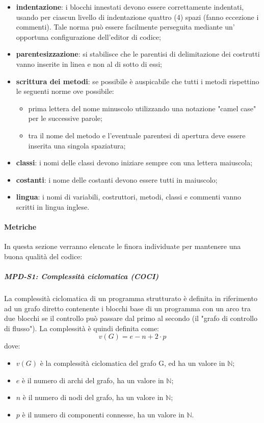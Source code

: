 \begin{itemize}
  \item \textbf{indentazione}: i blocchi innestati devono essere correttamente indentati, usando per ciascun livello di indentazione quattro (4) spazi (fanno eccezione i commenti).  Tale norma può essere facilmente perseguita mediante un' opportuna configurazione dell'editor di codice;
  \item \textbf{parentesizzazione}: si stabilisce che le parentisi di delimitazione dei costrutti vanno inserite in linea e non al di sotto di essi;
  \item \textbf{scrittura dei metodi}: se possibile è auspicabile che tutti i metodi rispettino le seguenti norme ove possibile:
        \begin{itemize}
          \item prima lettera del nome minuscolo utilizzando una notazione "camel case" per le successive parole;
          \item tra il nome del metodo e l'eventuale parentesi di apertura deve essere inserita una singola spaziatura;
        \end{itemize}
  \item \textbf{classi}: i nomi delle classi devono iniziare sempre con una lettera maiuscola;
  \item \textbf{costanti}: i nome delle costanti devono essere tutti in maiuscolo;
  \item \textbf{lingua}: i nomi di variabili, costruttori, metodi, classi e commenti vanno scritti in lingua inglese.
\end{itemize}

\paragraph{Metriche}
\label{_metricheQualitaCodice}
In questa sezione verranno elencate le  finora individuate per mantenere una buona qualità del codice:

\subparagraph{MPD-S1: Complessità ciclomatica (COCI)}
La complessità ciclomatica di un programma strutturato è definita in riferimento ad un grafo diretto
contenente i blocchi base di un programma con un arco tra due blocchi se il controllo può passare dal
primo al secondo (il "grafo di controllo di flusso"). La complessità è quindi definita come:
\[
    v(G) = e − n + 2 \cdot p
\]
dove:
\begin{itemize}
    \item $v(G)$ è la complessità ciclomatica del grafo G, ed ha un valore in $\mathbb{N}$;
    \item $e$ è il numero di archi del grafo, ha un valore in $\mathbb{N}$;
    \item $n$ è il numero di nodi del grafo, ha un valore in $\mathbb{N}$;
    \item $p$ è il numero di componenti connesse, ha un valore in $\mathbb{N}$.
\end{itemize}

